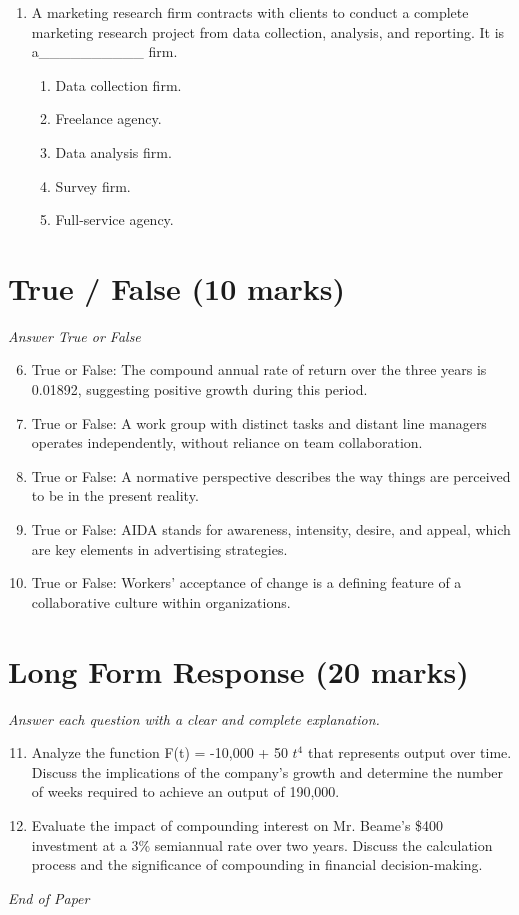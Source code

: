 \documentclass[12pt]{article}
\begin{document}
\begin{enumerate}[label=\arabic*.]
\begin{enumerate}[label=(\alph*)]
    \item Freight trains.
    \item Production factories.
    \item Haulage transport.
\end{enumerate}
\item A marketing research firm contracts with clients to conduct a complete marketing research project from data collection, analysis, and reporting. It is a\_\_\_\_\_\_\_\_\_\_ firm.
\begin{enumerate}[label=(\alph*)]
    \item Data collection firm.
    \item Freelance agency.
    \item Data analysis firm.
    \item Survey firm.
    \item Full-service agency.
\end{enumerate}
\end{enumerate}

\section*{True / False (10 marks)}
\textit{Answer True or False}
\begin{enumerate}[label=\arabic*.]
\setcounter{enumi}{5}
\item True or False: The compound annual rate of return over the three years is 0.01892, suggesting positive growth during this period.
\item True or False: A work group with distinct tasks and distant line managers operates independently, without reliance on team collaboration.
\item True or False: A normative perspective describes the way things are perceived to be in the present reality.
\item True or False: AIDA stands for awareness, intensity, desire, and appeal, which are key elements in advertising strategies.
\item True or False: Workers' acceptance of change is a defining feature of a collaborative culture within organizations.
\end{enumerate}

\section*{Long Form Response (20 marks)}
\textit{Answer each question with a clear and complete explanation.}
\begin{enumerate}[label=\arabic*.]
\setcounter{enumi}{10}
\item Analyze the function F(t) = -10,000 + 50 $t^4$ that represents output over time. Discuss the implications of the company's growth and determine the number of weeks required to achieve an output of 190,000.
\item Evaluate the impact of compounding interest on Mr. Beame's \$400 investment at a 3\% semiannual rate over two years. Discuss the calculation process and the significance of compounding in financial decision-making.
\end{enumerate}

\vfill
\noindent\textit{End of Paper}
\end{document}
